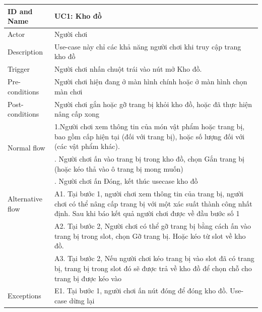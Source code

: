 \begin{center}
	\begin{tabular}{|l|p{12cm}|}
		\hline
		ID and Name & UC1: Kho đồ \\
		\hline
		Actor  & Người chơi \\
		\hline
		Description  & Use-case này chỉ các khả năng người chơi khi truy cập trang kho đồ\\
		\hline
		Trigger  & Người chơi nhấn chuột trái vào nút mở Kho đồ.\\
		\hline
		Pre-conditions & Người chơi hiện đang ở màn hình chính hoặc ở màn hình chọn màn chơi\\
		\hline
		Post-conditions & Người chơi gắn hoặc gỡ trang bị khỏi kho đồ, hoặc đã thực hiện nâng cấp xong\\
		\hline
		\multirow{2}{*}{Normal flow}      &\qquad 1.Người chơi xem thông tin của món vật phẩm hoặc trang bị, bao gồm cấp hiện tại (đối với trang bị), hoặc số lượng đối với (các vật phẩm khác).\\
		&\qquad 2. Người chơi ấn vào trang bị trong kho đồ, chọn Gắn trang bị (hoặc kéo thả vào ô trang bị mong muốn)\\
		&\qquad 3. Người chơi ấn Đóng, kết thúc usecase kho đồ\\
		\hline
		Alternative flow  & \qquad A1. Tại bước 1, người chơi xem thông tin của trang bị, người chơi có thể nâng cấp trang bị với một xác suất thành công nhất định. Sau khi báo kết quả người chơi được về đầu bước số 1\\
		&\qquad A2. Tại bước 2, Người chơi có thể gỡ trang bị bằng cách ấn vào trang bị trong slot, chọn Gỡ trang bị. Hoặc kéo từ slot về kho đồ.\\
		&\qquad A3. Tại bước 2, Nếu người chơi kéo trang bị vào slot đã có trang bị, trang bị trong slot đó sẽ được trả về kho đồ để chọn chỗ cho trang bị được kéo vào\\
		\hline
		Exceptions  & E1. Tại bước 1, người chơi ấn nút đóng để đóng kho đồ. Use-case dừng lại\\
		\hline
	\end{tabular}
\end{center}
